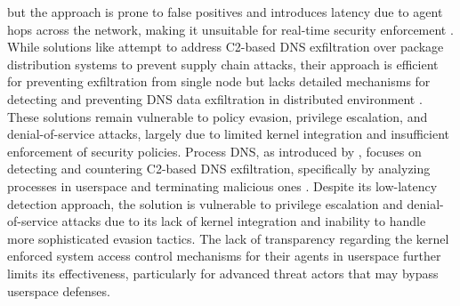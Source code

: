 \documentclass [11pt, proquest] {uwthesis}[2020/02/24]
\begin{document}
but the approach is prone to false positives and introduces latency due to agent hops across the network, making it unsuitable for real-time security enforcement \cite{9486400}. While solutions like \citeauthor{haider2024c2}  attempt to address C2-based DNS exfiltration over package distribution systems to prevent supply chain attacks, their approach is efficient for preventing exfiltration from single node but lacks detailed mechanisms for detecting and preventing DNS data exfiltration in distributed environment \cite{haider2024c2,sivakorn2019countering}. These solutions remain vulnerable to policy evasion, privilege escalation, and denial-of-service attacks, largely due to limited kernel integration and insufficient enforcement of security policies. Process DNS, as introduced by \citeauthor{sivakorn2019countering}, focuses on detecting and countering C2-based DNS exfiltration, specifically by analyzing processes in userspace and terminating malicious ones \cite{sivakorn2019countering}. Despite its low-latency detection approach, the solution is vulnerable to privilege escalation and denial-of-service attacks due to its lack of kernel integration and inability to handle more sophisticated evasion tactics. The lack of transparency regarding the kernel enforced system access control mechanisms for their agents in userspace further limits its effectiveness, particularly for advanced threat actors that may bypass userspace defenses.
\end{document}
